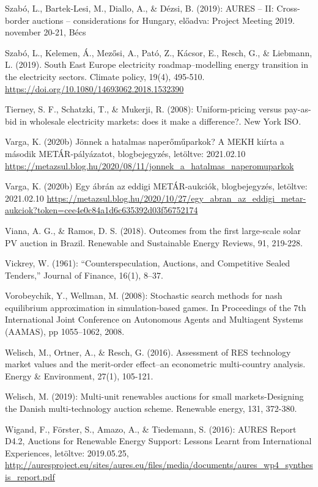 \documentclass[twoside, magyar, showtrims]{corvinusphd}
\theoremstyle{plain}
\theoremstyle{remark}
\theoremstyle{definition}
\begin{document}
\begin{thebibliography}{99}
Szabó, L., Bartek-Lesi, M., Diallo, A., \& Dézsi, B. (2019): AURES – II: Cross-border  auctions – considerations for Hungary, előadva: Project Meeting 2019. november 20-21, Bécs

Szabó, L., Kelemen, Á., Mezősi, A., Pató, Z., Kácsor, E., Resch, G., \& Liebmann, L. (2019). South East Europe electricity roadmap–modelling energy transition in the electricity sectors. Climate policy, 19(4), 495-510.
\url{https://doi.org/10.1080/14693062.2018.1532390}

Tierney, S. F., Schatzki, T., \& Mukerji, R. (2008): Uniform-pricing versus pay-as-bid in wholesale electricity markets: does it make a difference?. New York ISO.

Varga, K. (2020b) Jönnek a hatalmas naperőműparkok? A MEKH kiírta a második METÁR-pályázatot, blogbejegyzés, letöltve: 2021.02.10
\url{https://metazsul.blog.hu/2020/08/11/jonnek\_a\_hatalmas\_naperomuparkok}

Varga, K. (2020b) Egy ábrán az eddigi METÁR-aukciók, blogbejegyzés, letöltve: 2021.02.10
\url{https://metazsul.blog.hu/2020/10/27/egy\_abran\_az\_eddigi\_metar-aukciok?token=cee4e0c84a1d6c635392d03f56752174}

Viana, A. G., \& Ramos, D. S. (2018). Outcomes from the first large-scale solar PV auction in Brazil. Renewable and Sustainable Energy Reviews, 91, 219-228.

Vickrey, W. (1961): “Counterspeculation, Auctions, and Competitive Sealed Tenders,” Journal of Finance, 16(1), 8–37.

Vorobeychik, Y., Wellman, M. (2008): Stochastic search methods for nash equilibrium approximation in simulation-based games. In Proceedings of the 7th International Joint Conference on
Autonomous Agents and Multiagent Systems (AAMAS), pp 1055–1062, 2008.

Welisch, M., Ortner, A., \& Resch, G. (2016). Assessment of RES technology market values and the merit-order effect–an econometric multi-country analysis. Energy \& Environment, 27(1), 105-121.

Welisch, M. (2019): Multi-unit renewables auctions for small markets-Designing the Danish multi-technology auction scheme. Renewable energy, 131, 372-380.

Wigand, F., Förster, S., Amazo, A., \& Tiedemann, S. (2016): AURES Report D4.2, Auctions for Renewable Energy Support: Lessons Learnt from International Experiences, letöltve: 2019.05.25, 
\url{http://auresproject.eu/sites/aures.eu/files/media/documents/aures\_wp4\_synthesis\_report.pdf}


\end{thebibliography}
\end{document}
